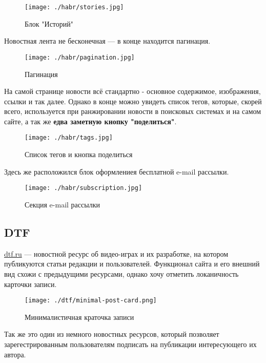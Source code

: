   \begin{figure}[!ht]
    \centering
      \texttt{[image: ./habr/stories.jpg]}
      \caption{Блок "Историй"}
    \label{stories}
  \end{figure}

  Новостная лента не бесконечная --- в конце находится пагинация.

  \begin{figure}[!ht]
    \centering
      \texttt{[image: ./habr/pagination.jpg]}
      \caption{Пагинация}
    \label{pagination}
  \end{figure}

  На самой странице новости всё стандартно - основное содержимое, изображения, ссылки и так далее. Однако в конце можно увидеть список тегов, которые, скорей всего, используется при ранжировании новости в поисковых системах и на самом сайте, а так же \textbf{едва заметную кнопку "поделиться"}.

  \begin{figure}[!ht]
    \centering
      \texttt{[image: ./habr/tags.jpg]}
      \caption{Список тегов и кнопка поделиться}
    \label{tags}
  \end{figure}

  Здесь же расположился блок оформлениея бесплатной e-mail рассылки.

  \begin{figure}[!ht]
    \centering
      \texttt{[image: ./habr/subscription.jpg]}
      \caption{Секция e-mail рассылки}
    \label{habr-subscription}
  \end{figure}

  \subsection{DTF}

  \href{https://dtf.ru/}{dtf.ru} --- новостной ресурс об видео-играх и их разработке, на котором публикуются статьи редакции и пользователей. Функционал сайта и его внешний вид схожи с предыдущими ресурсами, однако хочу отметить локаничность карточки записи.

  \begin{figure}[!ht]
    \centering
      \texttt{[image: ./dtf/minimal-post-card.png]}
      \caption{Минималистичная краточка записи}
    \label{minimal-post-card}
  \end{figure}

  Так же это один из немного новостных ресурсов, который позволяет зарегестрированным пользователям подписать на публикации интересующего их автора.

